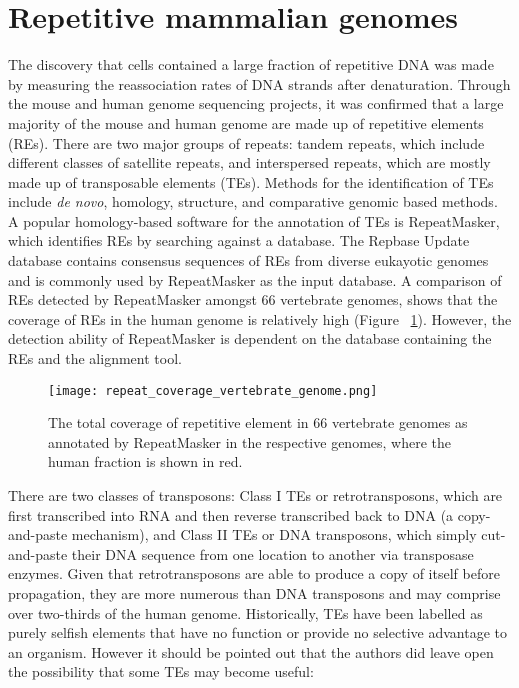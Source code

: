 \section{Repetitive mammalian genomes}

The discovery that cells contained a large fraction of repetitive DNA was made by measuring the reassociation rates of DNA strands after denaturation\cite{Britten1968}. Through the mouse\cite{pmid12466850} and human\cite{venter2001sequence, lander2001initial} genome sequencing projects, it was confirmed that a large majority of the mouse and human genome are made up of repetitive elements (REs). There are two major groups of repeats: tandem repeats, which include different classes of satellite repeats, and interspersed repeats, which are mostly made up of transposable elements (TEs)\cite{pmid9666329}. Methods for the identification of TEs include \textit{de novo}, homology, structure, and comparative genomic based methods\cite{Bergman01112007}. A popular homology-based software for the annotation of TEs is RepeatMasker, which identifies REs by searching against a database\cite{pmid19274634}. The Repbase Update database\cite{pmid16093699} contains consensus sequences of REs from diverse eukayotic genomes and is commonly used by RepeatMasker as the input database. A comparison of REs detected by RepeatMasker amongst 66 vertebrate genomes, shows that the coverage of REs in the human genome is relatively high (Figure ~\ref{fig:repeat_coverage_vertebrate_genome}). However, the detection ability of RepeatMasker is dependent on the database containing the REs and the alignment tool.

\begin{figure}[!ht]
   \centering
   \texttt{[image: repeat\_coverage\_vertebrate\_genome.png]}
   \caption[Coverage of repetitive elements in vertebrate genomes]{The total coverage of repetitive element in 66 vertebrate genomes as annotated by RepeatMasker in the respective genomes, where the human fraction is shown in red\cite{tang2014repcoverage}.}
   \label{fig:repeat_coverage_vertebrate_genome}
\end{figure}

There are two classes of transposons: Class I TEs or retrotransposons, which are first transcribed into RNA and then reverse transcribed back to DNA (a copy-and-paste mechanism), and Class II TEs or DNA transposons, which simply cut-and-paste their DNA sequence from one location to another via transposase enzymes. Given that retrotransposons are able to produce a copy of itself before propagation, they are more numerous than DNA transposons and may comprise over two-thirds of the human genome\cite{pmid22144907}. Historically, TEs have been labelled as purely selfish elements that have no function or provide no selective advantage to an organism\cite{doolittle1980selfish, orgel1980selfish}. However it should be pointed out that the authors did leave open the possibility that some TEs may become useful:

